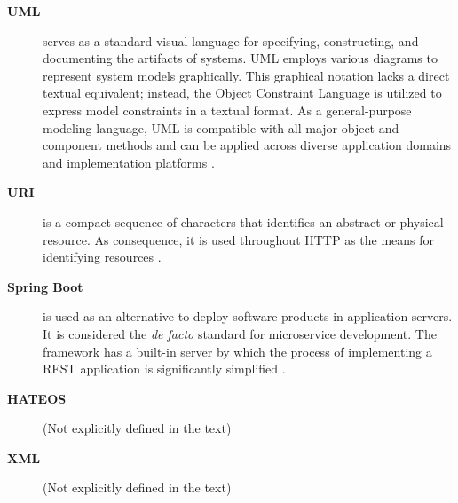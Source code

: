 \begin{description}
\item[\textbf{UML}] serves as a standard visual language for specifying, constructing, and documenting the artifacts of systems. UML employs various diagrams to represent system models graphically. This graphical notation lacks a direct textual equivalent; instead, the Object Constraint Language is utilized to express model constraints in a textual format. As a general-purpose modeling language, UML is compatible with all major object and component methods and can be applied across diverse application domains and implementation platforms \cite{garcia2004uml, he2006comparison}.

\item[\textbf{URI}] is a compact sequence of characters that identifies an abstract or physical resource. As consequence, it is used throughout HTTP as the means for identifying resources \cite{rfc3986, rfc9110}.

\item[\textbf{Spring Boot}] is used as an alternative to deploy software products in application servers. It is considered the \textit{de facto} standard for microservice development. The framework has a built-in server by which the process of implementing a REST application is significantly simplified \cite{gomez2020crudyleaf}.

\item[\textbf{HATEOS}]  
(Not explicitly defined in the text)

\item[\textbf{XML}] 
(Not explicitly defined in the text)

\end{description}